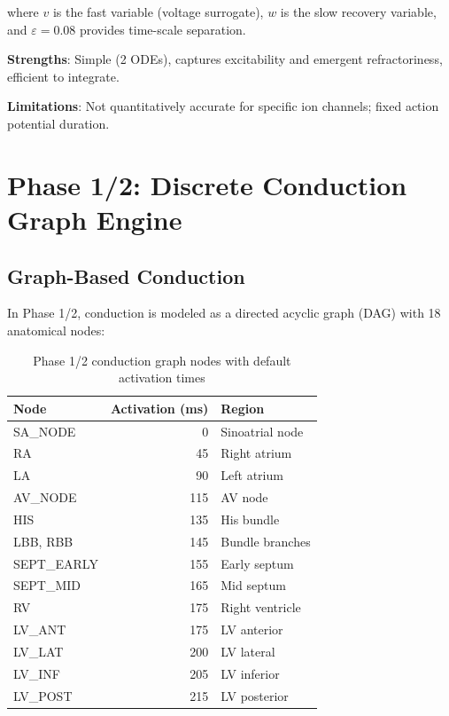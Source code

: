 \documentclass[12pt,oneside,a4paper]{book}
\begin{document}
where $v$ is the fast variable (voltage surrogate), $w$ is the slow recovery variable, and $\varepsilon = 0.08$ provides time-scale separation.

\textbf{Strengths}: Simple (2 ODEs), captures excitability and emergent refractoriness, efficient to integrate.

\textbf{Limitations}: Not quantitatively accurate for specific ion channels; fixed action potential duration.


\chapter{Phase 1/2: Discrete Conduction Graph Engine}

\section{Graph-Based Conduction}

In Phase 1/2, conduction is modeled as a directed acyclic graph (DAG) with 18 anatomical nodes:

\begin{table}[htb]
\centering
\begin{tabularx}{\textwidth}{|l|r|X|}
\hline
\textbf{Node} & \textbf{Activation (ms)} & \textbf{Region} \\
\hline
SA\_NODE & 0 & Sinoatrial node \\
RA & 45 & Right atrium \\
LA & 90 & Left atrium \\
AV\_NODE & 115 & AV node \\
HIS & 135 & His bundle \\
LBB, RBB & 145 & Bundle branches \\
SEPT\_EARLY & 155 & Early septum \\
SEPT\_MID & 165 & Mid septum \\
RV & 175 & Right ventricle \\
LV\_ANT & 175 & LV anterior \\
LV\_LAT & 200 & LV lateral \\
LV\_INF & 205 & LV inferior \\
LV\_POST & 215 & LV posterior \\
\hline
\end{tabularx}
\caption{Phase 1/2 conduction graph nodes with default activation times}
\label{tab:phase12_nodes}
\end{table}
\end{document}
